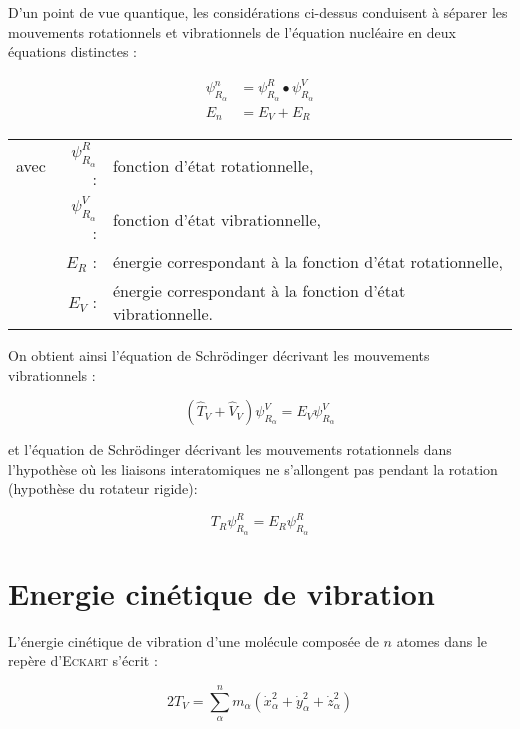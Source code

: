 D'un point de vue quantique, les considérations ci-dessus conduisent à séparer les mouvements rotationnels et vibrationnels de l'équation nucléaire en deux équations distinctes :

\begin{align}
	\psi^n_{R_{\alpha}} &= \psi^R_{R_{\alpha}} \bullet \psi^V_{R_{\alpha}} \\
	E_n &= E_V + E_R
\end{align}
\begin{flushleft}
\begin{tabular}{@{}lrp{10cm}}
avec & $\psi^R_{R_{\alpha}}$ : & fonction d'état rotationnelle, \\
& $\psi^V_{R_{\alpha}}$ : & fonction d'état vibrationnelle,\\
& $E_R$ : & énergie correspondant à la fonction d'état rotationnelle,\\
& $E_V$ : & énergie correspondant à la fonction d'état vibrationnelle.
\end{tabular}
\end{flushleft}

On obtient ainsi l'équation de Schr\"{o}dinger décrivant les mouvements vibrationnels :

\begin{equation}
	\left(\hat{T}_V + \hat{V}_V\right) \psi^V_{R_{\alpha}} = E_V \psi^V_{R_{\alpha}}
\end{equation}

\noindent et l'équation de Schr\"{o}dinger décrivant les mouvements rotationnels dans l'hypothèse où les liaisons interatomiques ne s'allongent pas pendant la rotation (hypothèse du rotateur rigide):

\begin{equation}
	T_R \psi^R_{R_{\alpha}} = E_R \psi^R_{R_{\alpha}}
\end{equation}


\section{Energie cinétique de vibration }

L'énergie cinétique de vibration d'une molécule composée de $n$ atomes dans le repère d'\textsc{Eckart} s'écrit :

\begin{equation}
	2T_V = \sum^n_{\alpha}m_{\alpha}\left( \dot{x}^2_{\alpha} + \dot{y}^2_{\alpha} + \dot{z}^2_{\alpha}\right)
\end{equation}

